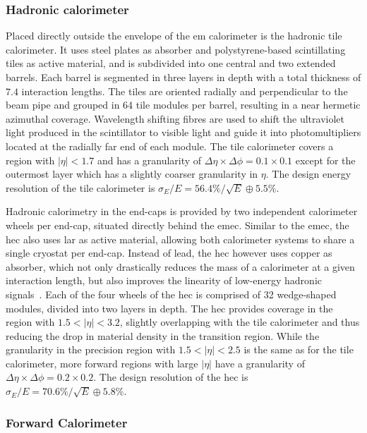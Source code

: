 \subsubsection{Hadronic calorimeter}

Placed directly outside the envelope of the \gls{em} calorimeter is the hadronic tile calorimeter. It uses steel plates as absorber and polystyrene-based scintillating tiles as active material, and is subdivided into one central and two extended barrels. Each barrel is segmented in three layers in depth with a total thickness of $7.4$ interaction lengths. The tiles are oriented radially and perpendicular to the beam pipe and grouped in 64 tile modules per barrel, resulting in a near hermetic azimuthal coverage. Wavelength shifting fibres are used to shift the ultraviolet light produced in the scintillator to visible light and guide it into photomultipliers located at the radially far end of each module. The tile calorimeter covers a region with $\vert\eta\vert <1.7$ and has a granularity of $\Delta \eta \times \Delta \phi = 0.1 \times 0.1$ except for the outermost layer which has a slightly coarser granularity in $\eta$. The design energy resolution of the tile calorimeter is $\sigma_E / E = 56.4\% / \sqrt{E} \oplus 5.5\%$.

Hadronic calorimetry in the end-caps is provided by two independent calorimeter wheels per end-cap, situated directly behind the \gls{emec}. Similar to the \gls{emec}, the \gls{hec} also uses \gls{lar} as active material, allowing both calorimeter systems to share a single cryostat per end-cap. Instead of lead, the \gls{hec} however uses copper as absorber, which not only drastically reduces the mass of a calorimeter at a given interaction length, but also improves the linearity of low-energy hadronic signals~\cite{Lee:2637852}. Each of the four wheels of the \gls{hec} is comprised of 32 wedge-shaped modules, divided into two layers in depth. The \gls{hec} provides coverage in the region with $1.5 < \vert\eta\vert <3.2$, slightly overlapping with the tile calorimeter and thus reducing the drop in material density in the transition region. While the granularity in the precision region with $1.5 < \vert\eta\vert <2.5$ is the same as for the tile calorimeter, more forward regions with large $\vert\eta\vert$ have a granularity of $\Delta \eta \times \Delta \phi = 0.2 \times 0.2$. The design resolution of the \gls{hec} is $\sigma_E / E = 70.6\% / \sqrt{E} \oplus 5.8\%$.

\subsubsection{Forward Calorimeter}

